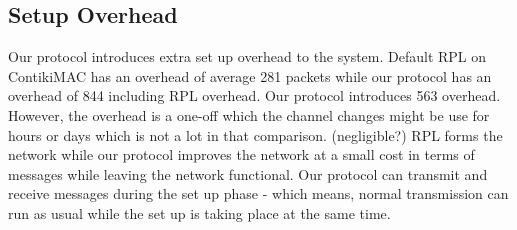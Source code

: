 \subsection{Setup Overhead}




Our protocol introduces extra set up overhead to the system. Default RPL on ContikiMAC has an overhead of average 281 packets while our protocol has an overhead of 844 including RPL overhead. Our protocol introduces 563 overhead. However, the overhead is a one-off which the channel changes might be use for hours or days which is not a lot in that comparison. (negligible?) RPL forms the network while our protocol improves the network at a small cost in terms of messages while leaving the network functional. Our protocol can transmit and receive messages during the set up phase - which means, normal transmission can run as usual while the set up is taking place at the same time.   
